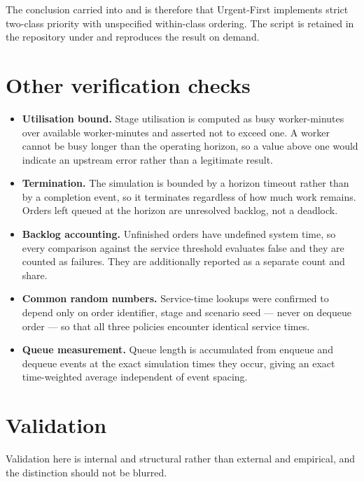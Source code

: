 The conclusion carried into  and  is therefore that
Urgent-First implements strict two-class priority with unspecified within-class ordering. The
script is retained in the repository under  and reproduces the
result on demand.

\section{Other verification checks}

\begin{itemize}
  \item \textbf{Utilisation bound.} Stage utilisation is computed as busy worker-minutes over
        available worker-minutes and asserted not to exceed one. A worker cannot be busy longer
        than the operating horizon, so a value above one would indicate an upstream error rather
        than a legitimate result.
  \item \textbf{Termination.} The simulation is bounded by a horizon timeout rather than by a
        completion event, so it terminates regardless of how much work remains. Orders left
        queued at the horizon are unresolved backlog, not a deadlock.
  \item \textbf{Backlog accounting.} Unfinished orders have undefined system time, so every
        comparison against the service threshold evaluates false and they are counted as
        failures. They are additionally reported as a separate count and share.
  \item \textbf{Common random numbers.} Service-time lookups were confirmed to depend only on
        order identifier, stage and scenario seed --- never on dequeue order --- so that all
        three policies encounter identical service times.
  \item \textbf{Queue measurement.} Queue length is accumulated from enqueue and dequeue events
        at the exact simulation times they occur, giving an exact time-weighted average
        independent of event spacing.
\end{itemize}

\section{Validation}

Validation here is internal and structural rather than external and empirical, and the
distinction should not be blurred.

